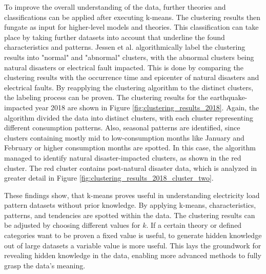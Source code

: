 To improve the overall understanding of the data, further theories and classifications can be applied after executing k-means.
The clustering results then fungate as input for higher-level models and theories.
This classification can take place by taking further datasets into account that underline the found characteristics and patterns.
Jessen et al. \cite{JES-IND} algorithmically label the clustering results into "normal" and "abnormal" clusters, with the abnormal clusters being natural disasters or electrical fault impacted.
This is done by comparing the clustering results with the occurrence time and epicenter of natural disasters and electrical faults.
By reapplying the clustering algorithm to the distinct clusters, the labeling process can be proven.
The clustering results for the earthquake-impacted year 2018 are shown in Figure \ref{fig:clustering_results_2018}.
Again, the algorithm divided the data into distinct clusters, with each cluster representing different consumption patterns.
Also, seasonal patterns are identified, since clusters containing mostly mid to low-consumption months like January and February or higher consumption months are spotted.
In this case, the algorithm managed to identify natural disaster-impacted clusters, as shown in the red cluster.
The red cluster contains post-natural disaster data, which is analyzed in greater detail in Figure \ref{fig:clustering_results_2018_cluster_two}.

These findings show, that k-means proves useful in understanding electricity load pattern datasets without prior knowledge.
By applying k-means, characteristics, patterns, and tendencies are spotted within the data.
The clustering results can be adjusted by choosing different values for $k$.
If a certain theory or defined categories want to be proven a fixed value is useful, to generate hidden knowledge out of large datasets a variable value is more useful.
This lays the groundwork for revealing hidden knowledge in the data, enabling more advanced methods to fully grasp the data's meaning.

